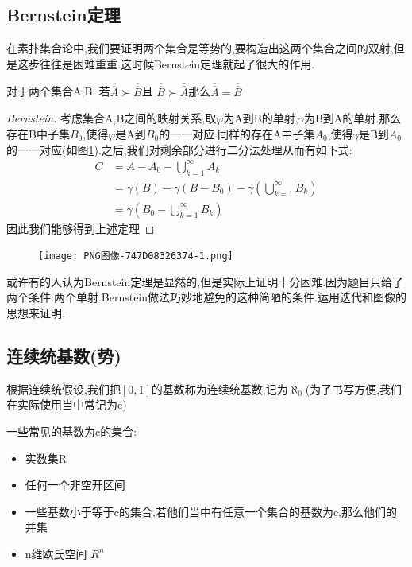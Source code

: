 \subsection{Bernstein定理}
在素扑集合论中,我们要证明两个集合是等势的,要构造出这两个集合之间的双射,但是这步往往是困难重重.这时候Bernstein定理就起了很大的作用.
\begin{Theorem}[Bernstein]
    对于两个集合A,B: 若\(\overline{\overline{A}} \succ \overline{\overline{B}}\)且 \(\overline{\overline{B}} \succ \overline{\overline{A}}\)那么\(\overline{\overline{A}} = \overline{\overline{B}}\)
\end{Theorem}
\begin{proof}[Bernstein]
    考虑集合A,B之间的映射关系,取\(\varphi\)为A到B的单射,\(\gamma\)为B到A的单射.那么存在B中子集\(B_0\),使得\(\varphi\)是A到\(B_0\)的一一对应.同样的存在A中子集\(A_0\),使得\(\gamma\)是B到\(A_0\)的一一对应(如图\ref{fig:enter-label_2}).之后,我们对剩余部分进行二分法处理从而有如下式:
    \begin{align*}
        C &= A - A_0 - \bigcup\limits_{k=1}^{\infty} A_k \\
        &= \gamma(B) -\gamma(B-B_0) - \gamma(\bigcup\limits_{k=1}^{\infty} B_k) \\
        &=\gamma(B_0 -\bigcup\limits_{k=1}^{\infty} B_k)
    \end{align*}
    因此我们能够得到上述定理
\end{proof}
  \begin{figure}[h]
    \centering
    \texttt{[image: PNG图像-747D08326374-1.png]}
    \caption{}
    \label{fig:enter-label_2}
\end{figure}
或许有的人认为Bernstein定理是显然的,但是实际上证明十分困难.因为题目只给了两个条件:两个单射.Bernstein做法巧妙地避免的这种简陋的条件.运用迭代和图像的思想来证明.
\subsection{连续统基数(势)}
根据连续统假设,我们把\([0,1]\)的基数称为连续统基数,记为\(\aleph_0\)(为了书写方便,我们在实际使用当中常记为c)
\begin{Example}
    一些常见的基数为c的集合: 
    \begin{itemize}
        \item 实数集R \\
        \item 任何一个非空开区间 \\
        \item 一些基数小于等于c的集合,若他们当中有任意一个集合的基数为c,那么他们的并集 \\
        \item n维欧氏空间 \(R^n\)
    \end{itemize}
\end{Example}
